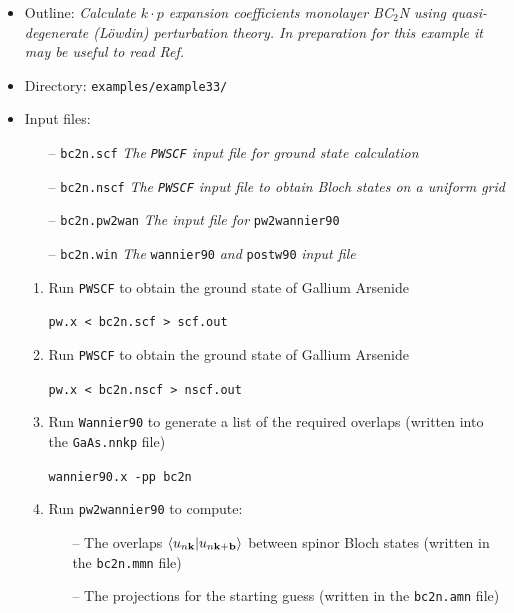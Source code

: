 \documentclass[a4paper,11pt,twoside]{article}
\begin{document}
\begin{itemize}

\item Outline: \textit{Calculate $k\cdot p$ expansion coefficients monolayer BC$_2$N using
quasi-degenerate (L\"owdin) 
perturbation theory. In preparation for this example it may be useful to read Ref.
\cite{ibanez-azpiroz-ArXiv2019} }



\item Directory: \verb|examples/example33/|

\item Input files:

\begin{itemize}

\item[--] \verb|bc2n.scf| \textit{The {\tt PWSCF} input file for ground state calculation}
\item[--] \verb|bc2n.nscf| \textit{The {\tt PWSCF} input file to obtain Bloch states on a uniform grid}
\item[--] \verb|bc2n.pw2wan| \textit{The input file for} \verb|pw2wannier90|
\item[--] \verb|bc2n.win| \textit{The} \verb|wannier90| \textit{and} \verb|postw90| \textit{input file}


\end{itemize}


\begin{enumerate}

\item Run {\tt PWSCF} to obtain the ground state of Gallium Arsenide

\verb|pw.x < bc2n.scf > scf.out|


\item Run {\tt PWSCF} to obtain the ground state of Gallium Arsenide

\verb|pw.x < bc2n.nscf > nscf.out|

\item Run {\tt Wannier90} to generate a list of the required overlaps (written into the \verb|GaAs.nnkp| file)

\verb|wannier90.x -pp bc2n|


\item Run {\tt pw2wannier90} to compute:

\begin{itemize}
\item[--] The overlaps $\langle u_{n\bf{k}}|u_{n\bf{k+b}}\rangle$ between spinor 
Bloch states (written in the \verb|bc2n.mmn| file) 
\item[--] The projections for the starting guess (written in the \verb|bc2n.amn| file)


\end{itemize}
\end{enumerate}
\end{itemize}
\end{document}
